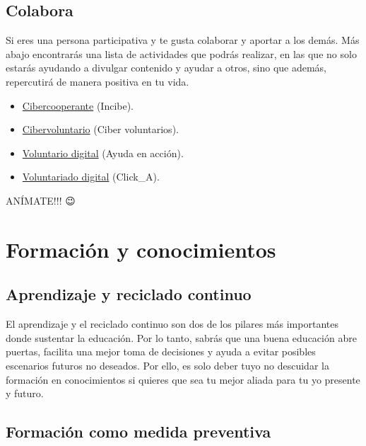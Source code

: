 \documentclass[
  a4paper,
  openany]{book}
\begin{document}
\hypertarget{colabora}{%
\section{Colabora}\label{colabora}}

Si eres una persona participativa y te gusta colaborar y aportar a los demás. Más abajo encontrarás una lista de actividades que podrás realizar, en las que no solo estarás ayudando a divulgar contenido y ayudar a otros, sino que además, repercutirá de manera positiva en tu vida.

\begin{itemize}
\item
  \href{https://www.incibe.es/cibercooperantes/quiero-ser-cibercooperante}{Cibercooperante} (Incibe).
\item
  \href{https://www.cibervoluntarios.org/}{Cibervoluntario} (Ciber voluntarios).
\item
  \href{https://ayudaenaccion.org/ong/colabora/voluntariado-digital/}{Voluntario digital} (Ayuda en acción).
\item
  \href{https://twitter.com/Clicka_CRE}{Voluntariado digital} (Click\_A).
\end{itemize}

ANÍMATE!!! 😉

\hypertarget{formaciuxf3n-y-conocimientos}{%
\chapter{Formación y conocimientos}\label{formaciuxf3n-y-conocimientos}}

\hypertarget{aprendizaje-y-reciclado-continuo}{%
\section{Aprendizaje y reciclado continuo}\label{aprendizaje-y-reciclado-continuo}}

El aprendizaje y el reciclado continuo son dos de los pilares más importantes donde sustentar la educación. Por lo tanto, sabrás que una buena educación abre puertas, facilita una mejor toma de decisiones y ayuda a evitar posibles escenarios futuros no deseados. Por ello, es solo deber tuyo no descuidar la formación en conocimientos si quieres que sea tu mejor aliada para tu yo presente y futuro.

\hypertarget{formaciuxf3n-como-medida-preventiva}{%
\section{Formación como medida preventiva}\label{formaciuxf3n-como-medida-preventiva}}
\end{document}
